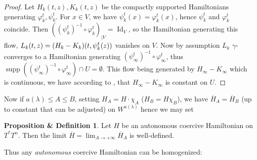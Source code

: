 \documentclass[JEP,XML,SOM,NoFloatCountersInSection,Unicode,published]{cedram}
\numberwithin{equation}{section}
\DeclareMathOperator{\Id}{Id}
\DeclareMathOperator{\supp}{supp}
\theoremstyle{plain}
\theoremstyle{definition}
\newtheorem{prop-def}[theorem]{Proposition \& Definition}
\theoremstyle{remark}
\begin{document}
\begin{proof}Let $H_{k}(t,z), K_{k}(t,z)$ be the compactly supported Hamiltonians generating $\varphi_{k}^t, \psi_{k}^t$.
For $x\in V$, we have $\psi_{k}^t(x)=\varphi_{k}^t(x)$, hence $\psi_{k}^{t}$ and $\varphi_{k}^t$ coin\-cide. Then $\left ((\psi_{k}^{t})^{-1}\circ \varphi_{k}^{t}\right) _{\mid V}= \Id_{V}$, so the Hamiltonian generating this flow, $L_{k}(t,z)=\allowbreak(H_{k}-\nobreak K_{k})(t, \psi_{k}^t(z))$ vanishes on $V$. Now by assumption $L_{k}$ $\gamma$-converges to a Hamiltonian generating $(\psi_\infty^{t})^{-1}{\circ} \varphi_\infty^{t}$, thus $\supp ((\psi_\infty^{t})^{-1}{\circ} \varphi_\infty^{t}) \cap U\!=\! \emptyset$. This flow being generated by $H_\infty- K_\infty$ which is continuous, we have according to \cite[Prop.\,2.25, p.\,52]{Humiliere2}, that $ H_\infty- K_\infty$ is constant on $U$.
\end{proof}

Now if $a(\lambda)\leq A\leq B$, setting $H_{A}=H\cdot \chi_{A}$ (\resp $H_{B}=H \chi_{B}$), we have $\overline H_{A}=\overline H_{B}$ (up to constant that can be adjusted) on $W^{a(\lambda)}$ hence we may set

\begin{prop-def}
Let $H$ be an autonomous coercive Hamiltonian on $T^*T^n$. Then the limit $\overline H = \lim_{A \to +\infty}\overline H_{A}$ is well-defined. %
\end{prop-def}

Thus any \emph{autonomous} coercive Hamiltonian can be homogenized:
\end{document}

